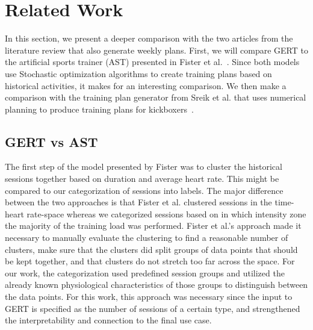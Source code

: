 \chapter{Related Work}
\label{sec:related_work}
In this section, we present a deeper comparison with the two articles from the literature review that also generate weekly plans. 
First, we will compare GERT to the artificial sports trainer (AST) presented in Fister et al.~\cite{fister2019generating}.
Since both models use Stochastic optimization algorithms to create training plans based on historical activities, it makes for an interesting comparison.
We then make a comparison with the training plan generator from Sreik et al. that uses numerical planning to produce training plans for kickboxers~\cite{skerik2018automated}.

\section{GERT vs AST}
The first step of the model presented by Fister was to cluster the historical sessions together based on duration and average heart rate.
This might be compared to our categorization of sessions into labels.
The major difference between the two approaches is that Fister et al. clustered sessions in the time-heart rate-space whereas we categorized sessions based on in which intensity zone the majority of the training load was performed.
Fister et al.'s approach made it necessary to manually evaluate the clustering to find a reasonable number of clusters, make sure that the clusters did split groups of data points that should be kept together, and that clusters do not stretch too far across the space.
For our work, the categorization used predefined session groups and utilized the already known physiological characteristics of those groups to distinguish between the data points.
For this work, this approach was necessary since the input to GERT is specified as the number of sessions of a certain type, and strengthened the interpretability and connection to the final use case.

